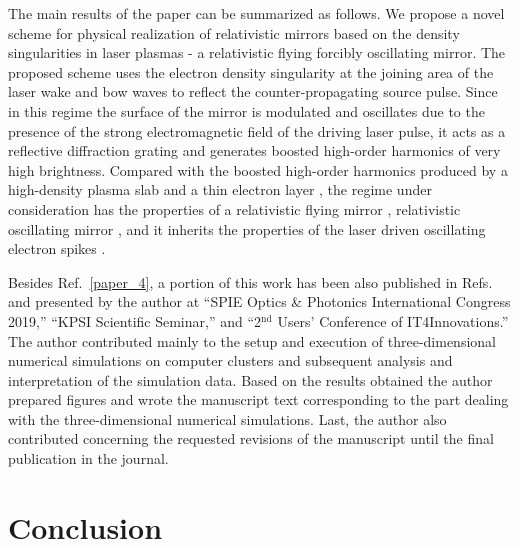 \documentclass[10pt, a4paper, twoside, openright]{report}
\newcommand{\q}[1]{``#1''} %
\begin{document}
The main results of the paper can be summarized as follows. We propose a novel scheme for physical realization of relativistic mirrors based on the density singularities in laser plasmas - a relativistic flying forcibly oscillating mirror. The proposed scheme uses the electron density singularity at the joining area of the laser wake and bow waves to reflect the counter-propagating source pulse. Since in this regime the surface of the mirror is modulated and oscillates due to the presence of the strong electromagnetic field of the driving laser pulse, it acts as a reflective diffraction grating and generates boosted high-order harmonics of very high brightness. Compared with the boosted high-order harmonics produced by a high-density plasma slab and a thin electron layer \cite{Kulagin2007, Esirkepov2009, Wu2010}, the regime under consideration has the properties of a relativistic flying mirror \cite{Bulanov2003}, relativistic oscillating mirror \cite{Bulanov1994, Naumova2004}, and it inherits the properties of the laser driven oscillating electron spikes \cite{Pirozhkov2014, Pirozhkov2017}. 

Besides Ref.~\ref{paper_4}, a portion of this work has been also published in Refs.~ and presented by the author at \q{SPIE Optics \& Photonics International Congress 2019,} \q{KPSI Scientific Seminar,} and \q{2$ ^{\mathrm{nd}} $ Users' Conference of IT4Innovations.} The author contributed mainly to the setup and execution of three-dimensional numerical simulations on computer clusters and subsequent analysis and interpretation of the simulation data. Based on the results obtained the author prepared figures and wrote the manuscript text corresponding to the part dealing with the three-dimensional numerical simulations. Last, the author also contributed concerning the requested revisions of the manuscript until the final publication in the journal.




\chapter{Conclusion\label{chap:conclusion}}
%
\end{document}
